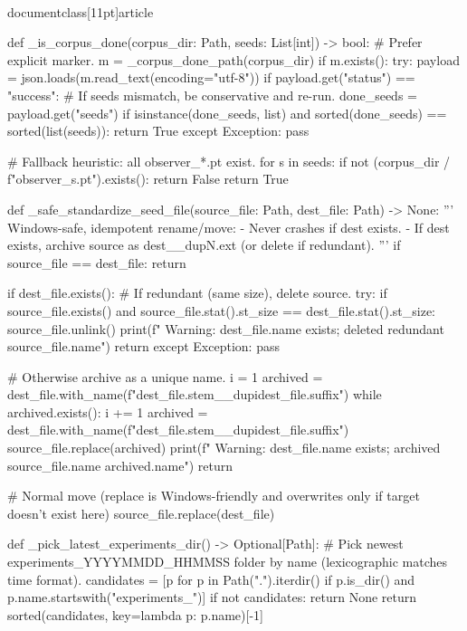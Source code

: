 \\documentclass[11pt]{article}
\begin{document}
\begin{CodeBlock}
def _is_corpus_done(corpus_dir: Path, seeds: List[int]) -> bool:
    # Prefer explicit marker.
    m = _corpus_done_path(corpus_dir)
    if m.exists():
        try:
            payload = json.loads(m.read_text(encoding="utf-8"))
            if payload.get("status") == "success":
                # If seeds mismatch, be conservative and re-run.
                done_seeds = payload.get("seeds")
                if isinstance(done_seeds, list) and sorted(done_seeds) == sorted(list(seeds)):
                    return True
        except Exception:
            pass

    # Fallback heuristic: all observer_*.pt exist.
    for s in seeds:
        if not (corpus_dir / f"observer_{s}.pt").exists():
            return False
    return True

def _safe_standardize_seed_file(source_file: Path, dest_file: Path) -> None:
    '''
    Windows-safe, idempotent rename/move:
    - Never crashes if dest exists.
    - If dest exists, archive source as dest__dupN.ext (or delete if redundant).
    '''
    if source_file == dest_file:
        return

    if dest_file.exists():
        # If redundant (same size), delete source.
        try:
            if source_file.exists() and source_file.stat().st_size == dest_file.stat().st_size:
                source_file.unlink()
                print(f"  Warning: {dest_file.name} exists; deleted redundant {source_file.name}")
                return
        except Exception:
            pass

        # Otherwise archive as a unique name.
        i = 1
        archived = dest_file.with_name(f"{dest_file.stem}__dup{i}{dest_file.suffix}")
        while archived.exists():
            i += 1
            archived = dest_file.with_name(f"{dest_file.stem}__dup{i}{dest_file.suffix}")
        source_file.replace(archived)
        print(f"  Warning: {dest_file.name} exists; archived {source_file.name}  {archived.name}")
        return

    # Normal move (replace is Windows-friendly and overwrites only if target doesn't exist here)
    source_file.replace(dest_file)

def _pick_latest_experiments_dir() -> Optional[Path]:
    # Pick newest experiments_YYYYMMDD_HHMMSS folder by name (lexicographic matches time format).
    candidates = [p for p in Path(".").iterdir() if p.is_dir() and p.name.startswith("experiments_")]
    if not candidates:
        return None
    return sorted(candidates, key=lambda p: p.name)[-1]


\end{CodeBlock}
\end{document}
